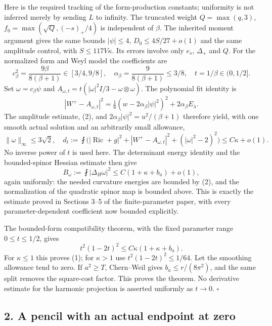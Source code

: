 \documentclass[
  10pt,
]{article}
\begin{document}
Here is the required tracking of the form-production constants;
uniformity is not inferred merely by sending \(L\) to infinity. The
truncated weight \(Q=\max(q,3)\), \(f_0=\max(\sqrt Q,(-s)_+/4)\) is
independent of \(\beta\). The inherited moment argument gives the same
bounds \(|\psi|\le4\), \(D_0\le4S/27+o(1)\) and the same amplitude
control, with \(S\le117V\kappa\). Its errors involve only \(e_s\),
\(\Delta_+\) and \(Q\). For the normalized form and Weyl model the
coefficients are \[
 c_\beta^2=\frac{9\beta}{8(\beta+1)}\in[3/4,9/8],\quad
 \alpha_\beta=\frac9{8(\beta+1)}\le3/8,\quad
 t=1/\beta\in(0,1/2].
\] Set \(\omega=c_\beta\psi\) and
\(A_{\omega,t}=t(|\omega|^2I/3-\omega\otimes\omega)\). The polynomial
fit identity is \[
 |W^+-A_{\omega,t}|^2
 =\tfrac16(w-2\alpha_\beta|\psi|^2)^2
                                  +2\alpha_\beta E_\lambda.
\] The amplitude estimate, (2), and
\(2\alpha_\beta|\psi|^2=u^2/(\beta+1)\) therefore yield, with one smooth
actual solution and an arbitrarily small allowance, \[
 \|\omega\|_\infty\le3\sqrt2,\quad
 d_t:=\fint\bigl(|\operatorname{Ric}+g|^2
   +|W^+-A_{\omega,t}|^2+(|\omega|^2-2)^2\bigr)
                       \le C\kappa+o(1).                 \tag{3}
\] No inverse power of \(t\) is used here. The determinant energy
identity and the bounded-spinor Hessian estimate then give \[
 B_\omega:=\fint|\Delta_H\omega|^2
                   \le C(1+\kappa+b_a)+o(1),             \tag{4}
\] again uniformly: the needed curvature energies are bounded by (2),
and the normalization of the quadratic spinor map is bounded above. This
is exactly the estimate proved in Sections 3--5 of the finite-parameter
paper, with every parameter-dependent coefficient now bounded
explicitly.

The bounded-form compatibility theorem, with the fixed parameter range
\(0\le t\le1/2\), gives \[
 t^2(1-2t)^2\le C\kappa(1+\kappa+b_a).                   \tag{5}
\] For \(\kappa\le1\) this proves (1); for \(\kappa>1\) use
\(t^2(1-2t)^2\le1/64\). Let the smoothing allowance tend to zero. If
\(a^2\ge T\), Chern--Weil gives \(b_a\le r/(8\pi^2)\), and the same
split removes the square-cost factor. This proves the theorem. No
derivative estimate for the harmonic projection is asserted uniformly as
\(t\to0\). \(\square\)

\hypertarget{a-pencil-with-an-actual-endpoint-at-zero}{%
\subsection{2. A pencil with an actual endpoint at
zero}\label{a-pencil-with-an-actual-endpoint-at-zero}}
\end{document}
